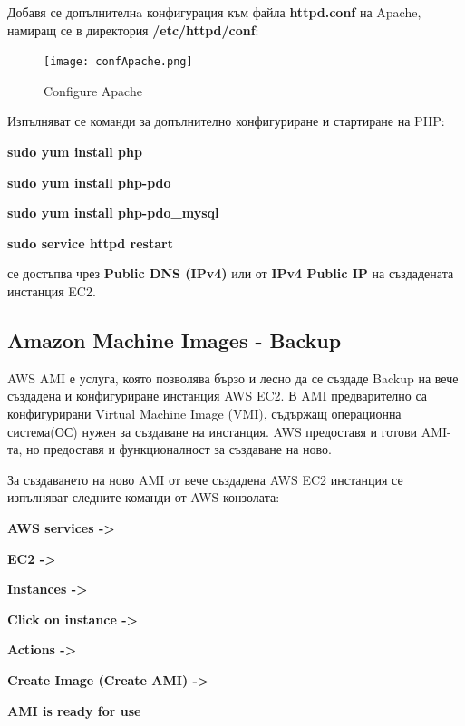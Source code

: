 \documentclass[12pt]{article}
\begin{document}
\noindent Добавя се допълнителнa конфигурация към файла \textbf{httpd.conf} на Apache, намиращ се в директория \textbf{/etc/httpd/conf}:

\begin{figure}[h!]
\centering
    \texttt{[image: confApache.png]}
  \caption{Configure Apache}
\end{figure}

\newpage

\noindent Изпълняват се команди за допълнително конфигуриране и стартиране на PHP:

\noindent \textbf{sudo yum install php}

\noindent \textbf{sudo yum install php-pdo}

\noindent \textbf{sudo yum install php-pdo\_mysql}

\noindent \textbf{sudo service httpd restart}

\medskip

 се достъпва чрез \textbf{Public DNS (IPv4)} или от \textbf{IPv4 Public IP} на създадената инстанция EC2.

\subsection{Amazon Machine Images - Backup}
\noindent AWS AMI е услуга, която позволява бързо и лесно да се създаде Backup на вече създадена и конфигуриране инстанция AWS EC2. В AMI предварително са конфигурирани Virtual Machine Image (VMI), съдържащ операционна система(ОС) нужен за създаване на инстанция. AWS предоставя и готови AMI-та, но предоставя и функционалност за създаване на ново. 
\medskip

\noindent За създаването на ново AMI от вече създадена AWS EC2 инстанция се изпълняват следните команди от AWS конзолата:
\medskip

\noindent \textbf{AWS services ->}

\noindent \textbf{EC2 ->}

\noindent \textbf{Instances ->}

\noindent \textbf{Click on instance ->}

\noindent \textbf{Actions ->}

\noindent \textbf{Create Image (Create AMI) ->}

\noindent \textbf{AMI is ready for use}

\newpage
\end{document}
